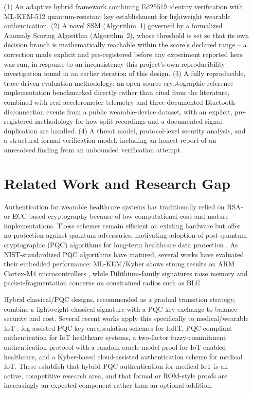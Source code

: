 \documentclass[conference]{IEEEtran}
\begin{document}
(1) An adaptive hybrid framework combining Ed25519 identity verification
with ML-KEM-512 quantum-resistant key establishment for lightweight wearable
authentication. (2) A novel SSM (Algorithm~1) governed by a formalized
Anomaly Scoring Algorithm (Algorithm~2), whose threshold is set so that its
own decision branch is mathematically reachable within the score's declared
range -- a correction made explicit and pre-registered before any
experiment reported here was run, in response to an inconsistency this
project's own reproducibility investigation found in an earlier iteration
of this design. (3) A fully reproducible, trace-driven evaluation
methodology: an open-source cryptographic reference implementation
benchmarked directly rather than cited from the literature, combined with
real accelerometer telemetry and three documented Bluetooth-disconnection
events from a public wearable-device dataset, with an explicit,
pre-registered methodology for how split recordings and a documented
signal-duplication are handled. (4) A threat model, protocol-level security
analysis, and a structural formal-verification model, including an honest
report of an unresolved finding from an unbounded verification attempt.

\section{Related Work and Research Gap}

Authentication for wearable healthcare systems has traditionally relied on
RSA- or ECC-based cryptography because of low computational cost and mature
implementations. These schemes remain efficient on existing hardware but
offer no protection against quantum adversaries, motivating adoption of
post-quantum cryptographic (PQC) algorithms for long-term healthcare data
protection \cite{fips203,shor1994}. As NIST-standardized PQC algorithms have
matured, several works have evaluated their embedded performance: ML-KEM/Kyber
shows strong results on ARM Cortex-M4 microcontrollers \cite{pqm4}, while
Dilithium-family signatures raise memory and packet-fragmentation concerns
on constrained radios such as BLE.

Hybrid classical/PQC designs, recommended as a gradual transition strategy,
combine a lightweight classical signature with a PQC key exchange to
balance security and cost. Several recent works apply this specifically to
medical/wearable IoT \cite{abood2025,adeli2023,alsaggaf2022,yan2026}:
fog-assisted PQC key-encapsulation schemes for IoHT, PQC-compliant
authentication for IoT healthcare systems, a two-factor fuzzy-commitment
authentication protocol with a random-oracle-model proof for IoT-enabled
healthcare, and a Kyber-based cloud-assisted authentication scheme for
medical IoT. These establish that hybrid PQC authentication for medical IoT
is an active, competitive research area, and that formal or ROM-style
proofs are increasingly an expected component rather than an optional
addition.
\end{document}
